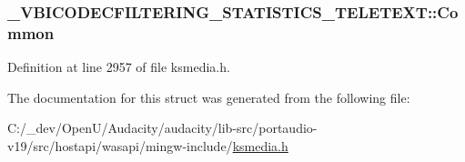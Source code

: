\subsubsection[{\texorpdfstring{Common}{Common}}]{ \+\_\+\+V\+B\+I\+C\+O\+D\+E\+C\+F\+I\+L\+T\+E\+R\+I\+N\+G\+\_\+\+S\+T\+A\+T\+I\+S\+T\+I\+C\+S\+\_\+\+T\+E\+L\+E\+T\+E\+X\+T\+::\+Common}\hypertarget{struct___v_b_i_c_o_d_e_c_f_i_l_t_e_r_i_n_g___s_t_a_t_i_s_t_i_c_s___t_e_l_e_t_e_x_t_aad9b434d51fe0b20f800c4823c714f58}{}\label{struct___v_b_i_c_o_d_e_c_f_i_l_t_e_r_i_n_g___s_t_a_t_i_s_t_i_c_s___t_e_l_e_t_e_x_t_aad9b434d51fe0b20f800c4823c714f58}


Definition at line 2957 of file ksmedia.\+h.



The documentation for this struct was generated from the following file\+:\begin{DoxyCompactItemize}
\item 
C\+:/\+\_\+dev/\+Open\+U/\+Audacity/audacity/lib-\/src/portaudio-\/v19/src/hostapi/wasapi/mingw-\/include/\hyperlink{ksmedia_8h}{ksmedia.\+h}\end{DoxyCompactItemize}
